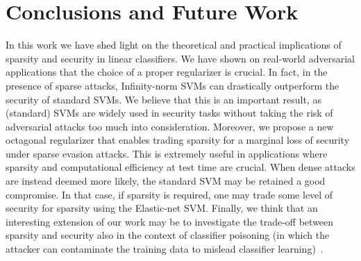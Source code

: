 \documentclass[runningheads,a4paper]{llncs}
\begin{document}
\section{Conclusions and Future Work}
\label{sect:conclusions}
In this work we have shed light on the theoretical and practical implications of sparsity and security in linear classifiers. We have shown on real-world adversarial applications that the choice of a proper regularizer is crucial. In fact, in the presence of sparse attacks, Infinity-norm SVMs can drastically outperform the security of standard SVMs. We believe that this is an important result, as (standard) SVMs are widely used in security tasks without taking the risk of adversarial attacks too much into consideration. 
Moreover, we propose a new octagonal regularizer that enables trading sparsity for a marginal loss of security under sparse evasion attacks. This is extremely useful in applications where sparsity and computational efficiency at test time are crucial.
When dense attacks are instead deemed more likely, the standard SVM may be retained a good compromise. In that case, if sparsity is required, one may trade some level of security for sparsity using the Elastic-net SVM. 
Finally, we think that an interesting extension of our work may be to investigate the trade-off between sparsity and security also in the context of classifier poisoning (in which the attacker can contaminate the training data to mislead classifier learning)~\cite{biggio14-tkde,biggio12-icml,biggio15-icml}.
\end{document}
